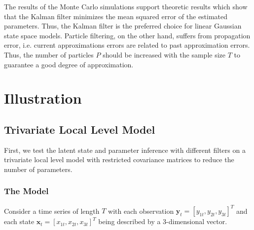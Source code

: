 \documentclass[11pt, oneside]{scrreprt}   	%
\begin{document}
The results of the Monte Carlo simulations support theoretic results which show that the Kalman filter minimizes the mean squared error of the estimated parameters. Thus, the Kalman filter is the preferred choice for linear Gaussian state space models. Particle filtering, on the other hand, suffers from propagation error, i.e. current approximations errors are related to past approximation errors. Thus, the number of particles $P$ should be increased with the sample size $T$ to guarantee a good degree of approximation.



\chapter{Illustration}
\label{chp:Illustration}

\section{Trivariate Local Level Model}
First, we test the latent state and parameter inference with different filters on a trivariate local level model with restricted covariance matrices to reduce the number of parameters. 

\subsection{The Model}
Consider a time series of length $T$ with each observation $\boldsymbol{y}_t=[y_{1t}, y_{2t}, y_{3t}]^T$ and each state $\boldsymbol{x}_t=[x_{1t}, x_{2t}, x_{3t}]^T$ being described by a 3-dimensional vector.
\end{document}
